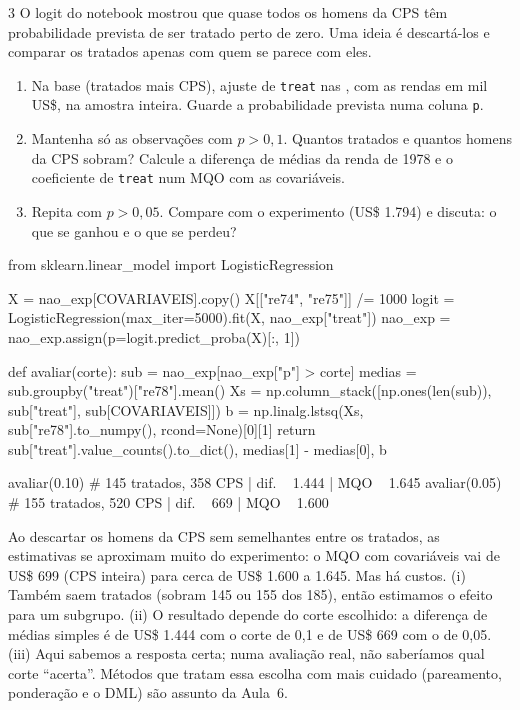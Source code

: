 \documentclass[lista]{tmlnotas}
\begin{document}
\begin{exercicio}{3}
O logit do notebook mostrou que quase todos os homens da CPS têm probabilidade
prevista de ser tratado perto de zero. Uma ideia é descartá-los e comparar os
tratados apenas com quem se parece com eles.
\begin{enumerate}[label=(\alph*)]
  \item Na base  (tratados mais CPS), ajuste
         de \texttt{treat} nas
        , com as rendas em mil US\$, na amostra inteira.
        Guarde a probabilidade prevista numa coluna \texttt{p}.
  \item Mantenha só as observações com $p > 0{,}1$. Quantos tratados e quantos
        homens da CPS sobram? Calcule a diferença de médias da renda de 1978 e o
        coeficiente de \texttt{treat} num MQO com as covariáveis.
  \item Repita com $p > 0{,}05$. Compare com o experimento (US\$ 1.794) e
        discuta: o que se ganhou e o que se perdeu?
\end{enumerate}
\end{exercicio}
\begin{solucao}
\begin{codigo}
from sklearn.linear_model import LogisticRegression

X = nao_exp[COVARIAVEIS].copy()
X[["re74", "re75"]] /= 1000
logit = LogisticRegression(max_iter=5000).fit(X, nao_exp["treat"])
nao_exp = nao_exp.assign(p=logit.predict_proba(X)[:, 1])

def avaliar(corte):
    sub = nao_exp[nao_exp["p"] > corte]
    medias = sub.groupby("treat")["re78"].mean()
    Xs = np.column_stack([np.ones(len(sub)), sub["treat"], sub[COVARIAVEIS]])
    b = np.linalg.lstsq(Xs, sub["re78"].to_numpy(), rcond=None)[0][1]
    return sub["treat"].value_counts().to_dict(), medias[1] - medias[0], b

avaliar(0.10)    # 145 tratados, 358 CPS | dif. ~ 1.444 | MQO ~ 1.645
avaliar(0.05)    # 155 tratados, 520 CPS | dif. ~ 669   | MQO ~ 1.600
\end{codigo}
Ao descartar os homens da CPS sem semelhantes entre os tratados, as estimativas
se aproximam muito do experimento: o MQO com covariáveis vai de US\$ 699 (CPS
inteira) para cerca de US\$ 1.600 a 1.645. Mas há custos. (i) Também saem
tratados (sobram 145 ou 155 dos 185), então estimamos o efeito para um
subgrupo. (ii) O resultado depende do corte escolhido: a diferença de médias
simples é de US\$ 1.444 com o corte de 0,1 e de US\$ 669 com o de 0,05.
(iii) Aqui sabemos a resposta certa; numa avaliação real, não saberíamos qual
corte ``acerta''. Métodos que tratam essa escolha com mais cuidado (pareamento,
ponderação e o DML) são assunto da Aula~6.
\end{solucao}
\end{document}
